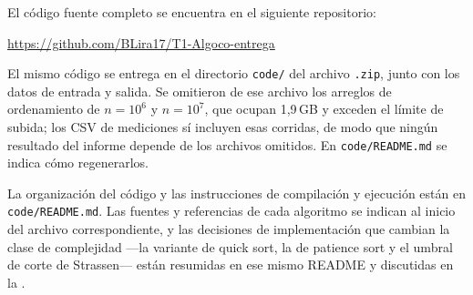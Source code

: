 
El código fuente completo se encuentra en el siguiente repositorio:

\begin{center}
  \url{https://github.com/BLira17/T1-Algoco-entrega}
\end{center}

El mismo código se entrega en el directorio \verb|code/| del archivo \verb|.zip|,
junto con los datos de entrada y salida. Se omitieron de ese archivo los arreglos
de ordenamiento de $n = 10^6$ y $n = 10^7$, que ocupan 1,9\,GB y exceden el
límite de subida; los CSV de mediciones sí incluyen esas corridas, de modo que
ningún resultado del informe depende de los archivos omitidos. En
\verb|code/README.md| se indica cómo regenerarlos.

La organización del código y las instrucciones de compilación y ejecución están
en \verb|code/README.md|. Las fuentes y referencias de cada algoritmo se indican
al inicio del archivo correspondiente, y las decisiones de implementación que
cambian la clase de complejidad ---la variante de quick sort, la de patience
sort y el umbral de corte de Strassen--- están resumidas en ese mismo README y
discutidas en la .
